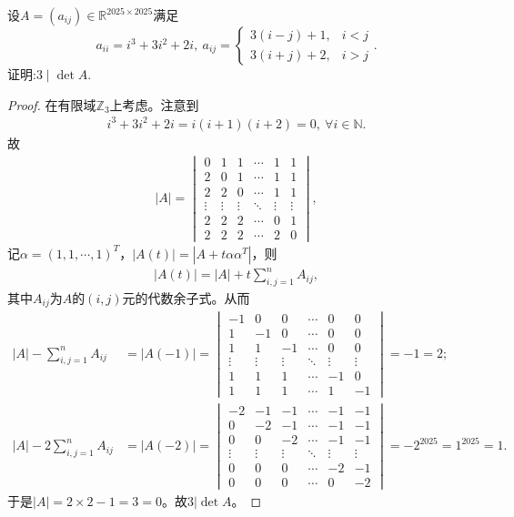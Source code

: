 \documentclass[../../main.tex]{subfiles}%
\begin{document}
\begin{example}
设$A = (a_{ij}) \in \mathbb{R}^{2025 \times 2025}$满足
\[
a_{ii} = i^3 + 3i^2 + 2i, \ a_{ij} = \begin{cases}
3(i - j) + 1, & i < j \\
3(i + j) + 2, & i > j
\end{cases}.
\]
证明:$3 \mid \det A$.
\end{example}
\begin{proof}
在有限域$\mathbb{Z}_3$上考虑。注意到
\begin{align*}
i^3+3i^2+2i=i(i+1)(i+2)=0,\ \forall i\in\mathbb{N}.
\end{align*}
故
\begin{align*}
|A|=\begin{vmatrix}
0&1&1&\cdots&1&1\\
2&0&1&\cdots&1&1\\
2&2&0&\cdots&1&1\\
\vdots&\vdots&\vdots&\ddots&\vdots&\vdots\\
2&2&2&\cdots&0&1\\
2&2&2&\cdots&2&0
\end{vmatrix},
\end{align*}
记$\alpha=(1,1,\cdots,1)^T$，$|A(t)|=|A+t\alpha\alpha^T|$，则
\begin{align*}
|A(t)|=|A|+t\sum_{i,j=1}^n A_{ij},
\end{align*}
其中$A_{ij}$为$A$的$(i,j)$元的代数余子式。从而
\begin{align*}
|A|-\sum_{i,j=1}^n A_{ij}&=|A(-1)|=\begin{vmatrix}
-1&0&0&\cdots&0&0\\
1&-1&0&\cdots&0&0\\
1&1&-1&\cdots&0&0\\
\vdots&\vdots&\vdots&\ddots&\vdots&\vdots\\
1&1&1&\cdots&-1&0\\
1&1&1&\cdots&1&-1
\end{vmatrix}=-1=2;\\
|A|-2\sum_{i,j=1}^n A_{ij}&=|A(-2)|=\begin{vmatrix}
-2&-1&-1&\cdots&-1&-1\\
0&-2&-1&\cdots&-1&-1\\
0&0&-2&\cdots&-1&-1\\
\vdots&\vdots&\vdots&\ddots&\vdots&\vdots\\
0&0&0&\cdots&-2&-1\\
0&0&0&\cdots&0&-2
\end{vmatrix}=-2^{2025}=1^{2025}=1.
\end{align*}
于是$|A|=2\times 2-1=3=0$。故$3|\det A$。

\end{proof}
\end{document}
